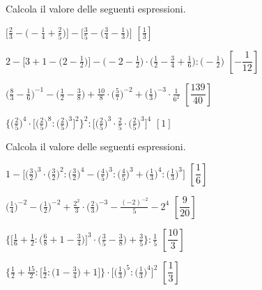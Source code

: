\begin{esercizio}[\Ast]
\label{ese:3.148}
 Calcola il valore delle seguenti espressioni.
\begin{enumeratea}
\spazielenx
\item \(\displaystyle{\bigg[\frac{2}{3}-\bigg(-\frac{1}{4}+\frac{2}{5}\bigg)
\bigg]-\bigg[\frac{3}{5}-%
\bigg(\frac{3}{4}-\frac{1}{3}\bigg)\bigg]}\)
  \hfill \(\left[\frac{1}{3} \right]\)
\item \(\displaystyle{2-\bigg[3+1-\bigg(2-\frac{1}{2}\bigg)\bigg]-
\bigg(-2-\frac{1}{2}\bigg)\cdot%
\bigg(\frac{1}{2}-\frac{3}{4}+\frac{1}{6}\bigg):\bigg(-{\frac{1}{2}}\bigg)}\)
  \hfill \(\left[-\dfrac{1}{12} \right]\)
\item \(\displaystyle{\bigg(\frac{8}{3}-\frac{1}{6}\bigg)^{-1}-
\bigg(\frac{1}{2}-\frac{3}{8}\bigg)+\frac{10}{8}\cdot%
\bigg(\frac{5}{7}\bigg)^{-2}+\bigg(\frac{1}{3}\bigg)^{-3}\cdot
\frac{1}{6^{2}}}\)
  \hfill \(\left[\dfrac{139}{40} \right]\)
\item \(\displaystyle{\bigg\{\bigg(\frac{2}{5}\bigg)^{4}\cdot
\bigg[\bigg(\frac{2}{5}\bigg)^{8}:%
\bigg(\frac{2}{5}\bigg)^{3}\bigg]^{2}\bigg\}^{2}:
\bigg[\bigg(\frac{2}{5}\bigg)^{3}\cdot{\frac{2}{5}}\cdot%
\bigg(\frac{2}{5}\bigg)^{3}\bigg]^{4}}\)
  \hfill \(\left[1 \right]\)
\end{enumeratea}
\end{esercizio}

\begin{esercizio}[\Ast]
\label{ese:3.149}
Calcola il valore delle seguenti espressioni.
\begin{enumeratea}
\spazielenx
\item \(\displaystyle{1-\bigg[\bigg(\frac{3}{2}\bigg)^{3}\cdot%
\bigg(\frac{3}{2}\bigg)^{2}:\bigg(\frac{3}{2}\bigg)^{4}-
\bigg(\frac{4}{5}\bigg)^{3}:\bigg(\frac{4}{5}\bigg)^{3}+%
\bigg(\frac{1}{3}\bigg)^{4}:\bigg(\frac{1}{3}\bigg)^{3}\bigg]}\)
  \hfill \(\left[\dfrac{1}{6} \right]\)
\item \(\displaystyle{\bigg(\frac{1}{4}\bigg)^{-2}-\bigg(\frac{1}{2}\bigg)^{-2}+
\frac{2^{2}}{3}\cdot%
\bigg(\frac{2}{3}\bigg)^{-3}-\frac{(-2)^{-2}}{5}-2^{4}}\)
  \hfill \(\left[\dfrac{9}{20} \right]\)
\item \(\displaystyle{\bigg\{\bigg[\frac{1}{6}+\frac{1}{2}:\bigg(\frac{6}{8}+1-
\frac{3}{4}\bigg)\bigg]^{3}\cdot%
\bigg(\frac{3}{5}-\frac{3}{8}\bigg)+\frac{3}{5}\bigg\}:\frac{1}{5}}\)
  \hfill \(\left[\dfrac{10}{3} \right]\)
\item \(\displaystyle{\bigg\{\frac{1}{2}+\frac{15}{2}:\bigg[\frac{1}{2}:
\bigg(1-\frac{3}{4}\bigg)+1\bigg]\bigg\}\cdot%
\bigg[\bigg(\frac{1}{3}\bigg)^{5}:\bigg(\frac{1}{3}\bigg)^{4}\bigg]^{2}}\)
  \hfill \(\left[\dfrac{1}{3} \right]\)
\end{enumeratea}
\end{esercizio}

